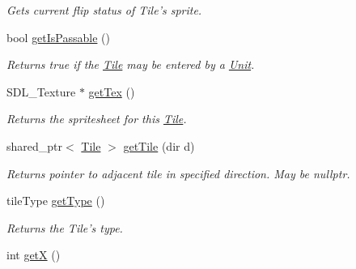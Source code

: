 \begin{DoxyCompactItemize}
\begin{DoxyCompactList}\small\item\em Gets current flip status of Tile’s sprite. \end{DoxyCompactList}\item 
bool \hyperlink{class_tile_aaddc2d065a537489c31de4a566bb0bd5}{get\+Is\+Passable} ()\hypertarget{class_tile_aaddc2d065a537489c31de4a566bb0bd5}{}\label{class_tile_aaddc2d065a537489c31de4a566bb0bd5}

\begin{DoxyCompactList}\small\item\em Returns true if the \hyperlink{class_tile}{Tile} may be entered by a \hyperlink{class_unit}{Unit}. \end{DoxyCompactList}\item 
S\+D\+L\+\_\+\+Texture $\ast$ \hyperlink{class_tile_a50aa680406e6f9898c24aee23dae3862}{get\+Tex} ()\hypertarget{class_tile_a50aa680406e6f9898c24aee23dae3862}{}\label{class_tile_a50aa680406e6f9898c24aee23dae3862}

\begin{DoxyCompactList}\small\item\em Returns the spritesheet for this \hyperlink{class_tile}{Tile}. \end{DoxyCompactList}\item 
shared\+\_\+ptr$<$ \hyperlink{class_tile}{Tile} $>$ \hyperlink{class_tile_ac8d11748dbf9b8f57dd2a56f4a733065}{get\+Tile} (dir d)\hypertarget{class_tile_ac8d11748dbf9b8f57dd2a56f4a733065}{}\label{class_tile_ac8d11748dbf9b8f57dd2a56f4a733065}

\begin{DoxyCompactList}\small\item\em Returns pointer to adjacent tile in specified direction. May be nullptr. \end{DoxyCompactList}\item 
tile\+Type \hyperlink{class_tile_a36871de25627c7483c31807da1c28706}{get\+Type} ()\hypertarget{class_tile_a36871de25627c7483c31807da1c28706}{}\label{class_tile_a36871de25627c7483c31807da1c28706}

\begin{DoxyCompactList}\small\item\em Returns the Tile’s type. \end{DoxyCompactList}\item 
int \hyperlink{class_tile_a25b90e07fd9cdaba1df3ac2a9b6d032b}{getX} ()\hypertarget{class_tile_a25b90e07fd9cdaba1df3ac2a9b6d032b}{}\label{class_tile_a25b90e07fd9cdaba1df3ac2a9b6d032b}


\end{DoxyCompactItemize}
